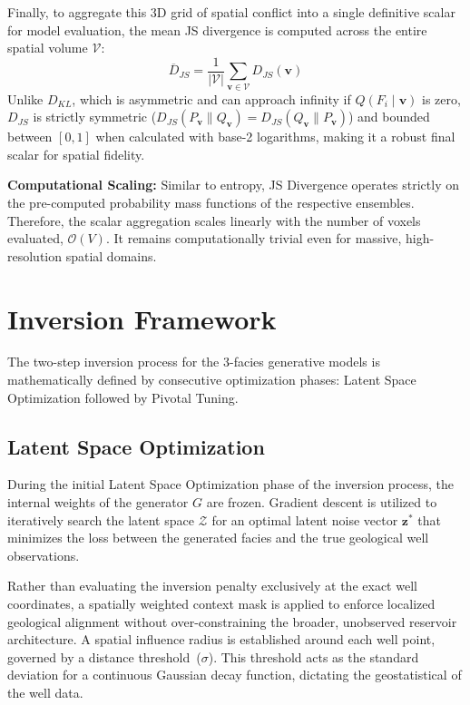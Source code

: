 Finally, to aggregate this 3D grid of spatial conflict into a single definitive scalar for model evaluation, the mean JS divergence is computed across the entire spatial volume $\mathcal{V}$:
\begin{equation}\label{eq:js_div_scalar}
    \overline{D}_{JS} = \frac{1}{|\mathcal{V}|} \sum_{\mathbf{v} \in \mathcal{V}} D_{JS}(\mathbf{v})
\end{equation}
Unlike $D_{KL}$, which is asymmetric and can approach infinity if $Q(F_i \mid \mathbf{v})$ is zero, $D_{JS}$ is strictly symmetric ($D_{JS}(P_{\mathbf{v}} \parallel Q_{\mathbf{v}}) = D_{JS}(Q_{\mathbf{v}} \parallel P_{\mathbf{v}})$) and bounded between $[0, 1]$ when calculated with base-2 logarithms, making it a robust final scalar for spatial fidelity.

\textbf{Computational Scaling:} Similar to entropy, JS Divergence operates strictly on the pre-computed probability mass functions of the respective ensembles. Therefore, the scalar aggregation scales linearly with the number of voxels evaluated, $\mathcal{O}(V)$. It remains computationally trivial even for massive, high-resolution spatial domains.


\section{Inversion Framework}\label{app:optimization_math}
The two-step inversion process for the 3-facies generative models is mathematically defined by consecutive optimization phases: Latent Space Optimization followed by Pivotal Tuning.

\subsection{Latent Space Optimization}
During the initial Latent Space Optimization phase of the inversion process, the internal weights of the generator $G$ are frozen. Gradient descent is utilized to iteratively search the latent space $\mathcal{Z}$ for an optimal latent noise vector $\mathbf{z}^*$ that minimizes the loss between the generated facies and the true geological well observations. 

Rather than evaluating the inversion penalty exclusively at the exact well coordinates, a spatially weighted context mask is applied to enforce localized geological alignment without over-constraining the broader, unobserved reservoir architecture. A spatial influence radius is established around each well point, governed by a distance threshold~($\sigma$). This threshold acts as the standard deviation for a continuous Gaussian decay function, dictating the geostatistical  of the well data.

